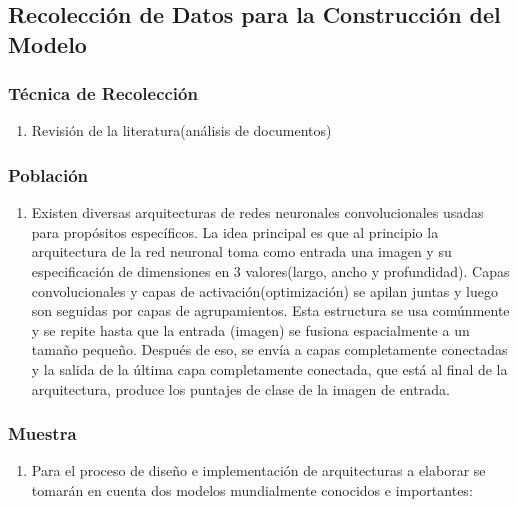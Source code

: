 	\newpage
\subsection{Recolección de Datos para la Construcción del Modelo}
		\subsubsection{Técnica de Recolección}
		\begin{enumerate}		
			\item[]   {Revisión de la literatura(análisis de documentos)}
		\end{enumerate}

		\subsubsection{Población}
		\begin{enumerate}		
			\item[] Existen diversas arquitecturas de redes neuronales convolucionales usadas para propósitos específicos. La idea principal es que al principio la arquitectura de la red neuronal toma como entrada una imagen y su especificación de dimensiones en 3 valores(largo, ancho y profundidad). Capas convolucionales y capas de activación(optimización) se apilan juntas y luego son seguidas por capas de agrupamientos. Esta estructura se usa comúnmente y se repite hasta que la entrada (imagen) se fusiona espacialmente a un tamaño pequeño. Después de eso, se envía a capas completamente conectadas y la salida de la última capa completamente conectada, que está al final de la arquitectura, produce los puntajes de clase de la imagen de entrada.
		\end{enumerate}
		
	
		\subsubsection{Muestra}
		\begin{enumerate}		
		\item[] Para el proceso de diseño e implementación de arquitecturas a elaborar se tomarán en cuenta dos modelos mundialmente conocidos e importantes:
		\end{enumerate}
				
